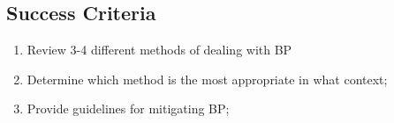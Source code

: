\subsection{Success Criteria}
\begin{enumerate}
    \item Review 3-4 different methods of dealing with BP
    \item Determine which method is the most appropriate in what context;
    \item Provide guidelines for mitigating BP;
\end{enumerate}

